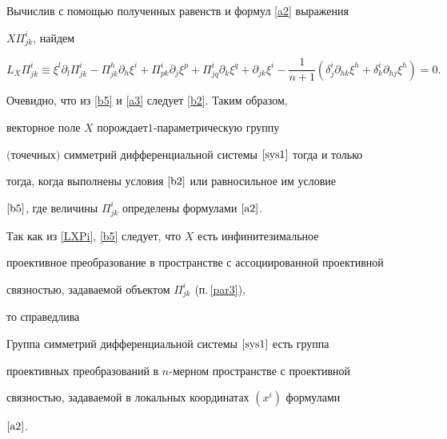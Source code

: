 Вычислив с помощью полученных равенств и формул \eqref{a2} выражения


$X\Pi^{i}_{jk}$, найдем


\begin{equation}\label{b5}


L_{X}\Pi^{i}_{jk}\equiv


\xi^{l}\partial_{l}\Pi^{i}_{jk}-\Pi^{h}_{jk}\partial_{h}\xi^{i}


+\Pi^{i}_{pk}\partial_{j}\xi^{p}+


\Pi^{i}_{jq}\partial_{k}\xi^{q}+\partial_{jk}\xi^{i}-


\frac{1}{n+1}(\delta^{i}_{j}\partial_{hk}\xi^{h}


+ \delta^{i}_{k}\partial_{hj}\xi^{h})=0.


\end{equation}


Очевидно, что из \eqref{b5} и \eqref{a3} следует \eqref{b2}. Таким образом,


векторное поле $X$ порождает\linebreak $1$-параметрическую группу


$($точечных$)$ симметрий дифференциальной системы $\eqref{sys1}$ тогда и только


тогда, когда выполнены условия $\eqref{b2}$ или равносильное им условие


$\eqref{b5}$, где величины $\Pi^{i}_{jk}$ определены формулами $\eqref{a2}$.





Так как из \eqref{LXPi}, \eqref{b5} следует, что $X$ есть инфинитезимальное


проективное преобразование в пространстве с ассоциированной проективной


связностью, задаваемой объектом $\Pi^{i}_{jk}$ (п.\,\ref{par3}),


то справедлива








\begin{thms}\label{th6}


Группа симметрий дифференциальной системы $\eqref{sys1}$ есть группа


проективных преобразований в $n$-мерном пространстве с проективной


связностью, задаваемой в локальных координатах $(x^{i})$ формулами


$\eqref{a2}$.


\end{thms}





